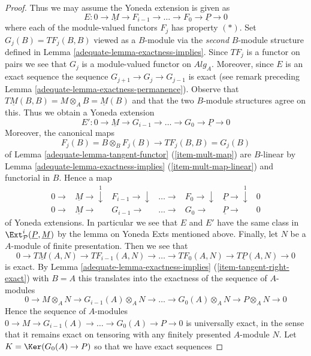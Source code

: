 \begin{proof}
\medskip\noindent
Thus we may assume the Yoneda extension is given as
$$
E : 0 \to \underline{M} \to F_{i - 1} \to \ldots \to
F_0 \to \underline{P} \to 0
$$
where each of the module-valued functors $F_j$ has property $(*)$.
Set $G_j(B) = TF_j(B, B)$ viewed as a $B$-module via the {\it second}
$B$-module structure defined in
Lemma \ref{adequate-lemma-exactness-implies}.
Since $TF_j$ is a functor on pairs we see that $G_j$ is a module-valued
functor on $\textit{Alg}_A$. Moreover, since $E$ is an exact sequence
the sequence $G_{j + 1} \to G_j \to G_{j - 1}$ is exact (see remark
preceding
Lemma \ref{adequate-lemma-exactness-permanence}).
Observe that $T\underline{M}(B, B) = M \otimes_A B = \underline{M}(B)$
and that the two $B$-module structures agree on this.
Thus we obtain a Yoneda extension
$$
E' :  0 \to \underline{M} \to G_{i - 1} \to \ldots \to
G_0 \to \underline{P} \to 0
$$
Moreover, the canonical maps
$$
F_j(B) = B \otimes_B F_j(B) \longrightarrow TF_j(B, B) = G_j(B)
$$
of
Lemma \ref{adequate-lemma-tangent-functor} (\ref{item-mult-map})
are $B$-linear by
Lemma \ref{adequate-lemma-exactness-implies} (\ref{item-mult-map-linear})
and functorial in $B$. Hence a map
$$
\begin{array}{ccccccc}0 \longrightarrow & \underline{M} \longrightarrow\overset{1}{\downarrow} & F_{i - 1} \longrightarrow\downarrow & \ldots \longrightarrow & F_0 \longrightarrow\downarrow & \underline{P} \longrightarrow\overset{1}{\downarrow} & 0 \\ 0 \longrightarrow & \underline{M} \longrightarrow & G_{i - 1} \longrightarrow & \ldots \longrightarrow & G_0 \longrightarrow & \underline{P} \longrightarrow & 0\end{array}
$$
of Yoneda extensions. In particular we see that $E$ and $E'$ have the
same class in $\Ext^i_\mathcal{P}(\underline{P}, \underline{M})$
by the lemma on Yoneda Exts mentioned above. Finally, let $N$ be a
$A$-module of finite presentation. Then we see that
$$
0 \to T\underline{M}(A, N) \to TF_{i - 1}(A, N) \to \ldots \to
TF_0(A, N) \to T\underline{P}(A, N) \to 0
$$
is exact. By
Lemma \ref{adequate-lemma-exactness-implies} (\ref{item-tangent-right-exact})
with $B = A$ this translates into the exactness of the sequence of
$A$-modules
$$
0 \to M \otimes_A N \to G_{i - 1}(A) \otimes_A N \to \ldots \to
G_0(A) \otimes_A N \to P \otimes_A N \to 0
$$
Hence the sequence of $A$-modules
$0 \to M \to G_{i - 1}(A) \to \ldots \to G_0(A) \to P \to 0$
is universally exact, in the sense that it remains exact on tensoring
with any finitely presented $A$-module $N$. Let
$K = \Ker(G_0(A) \to P)$ so that we have exact sequences

\end{proof}
